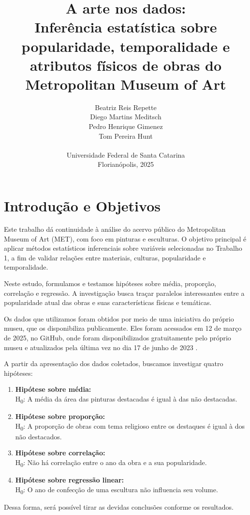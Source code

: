 \documentclass[11pt,a4paper]{article}
\title{A arte nos dados: \\ Inferência estatística sobre popularidade, temporalidade e atributos físicos de obras do Metropolitan Museum of Art}
\author{
  Beatriz Reis Repette \\
  Diego Martins Meditsch \\
  Pedro Henrique Gimenez \\
  Tom Pereira Hunt \\
  \\
  Universidade Federal de Santa Catarina \\
  Florianópolis, 2025
}
\date{}
\begin{document}
\maketitle

\section{Introdução e Objetivos}
Este trabalho dá continuidade à análise do acervo público do Metropolitan Museum of Art (MET), com foco em pinturas e esculturas. O objetivo principal é aplicar métodos estatísticos inferenciais sobre variáveis selecionadas no Trabalho 1, a fim de validar relações entre materiais, culturas, popularidade e temporalidade.

Neste estudo, formulamos e testamos hipóteses sobre média, proporção, correlação e regressão. A investigação busca traçar paralelos interessantes entre a popularidade atual das obras e suas características físicas e temáticas.

Os dados que utilizamos foram obtidos por meio de uma iniciativa do próprio museu, que os disponibiliza publicamente. Eles foram acessados em 12 de março de 2025, no GitHub, onde foram disponibilizados gratuitamente pelo próprio museu e atualizados pela última vez no dia 17 de junho de 2023 \cite{ref1}.

A partir da apresentação dos dados coletados, buscamos investigar quatro hipóteses:
\begin{enumerate}
    \item \textbf{Hipótese sobre média:} \\H\textsubscript{0}: A média da área das pinturas destacadas é igual à das não destacadas.
    \item \textbf{Hipótese sobre proporção:} \\H\textsubscript{0}: A proporção de obras com tema religioso entre os destaques é igual à dos não destacados.
    \item \textbf{Hipótese sobre correlação:} \\H\textsubscript{0}: Não há correlação entre o ano da obra e a sua popularidade.
    \item \textbf{Hipótese sobre regressão linear:} \\H\textsubscript{0}: O ano de confecção de uma escultura não influencia seu volume.
\end{enumerate}
Dessa forma, será possível tirar as devidas conclusões conforme os resultados.
\end{document}
